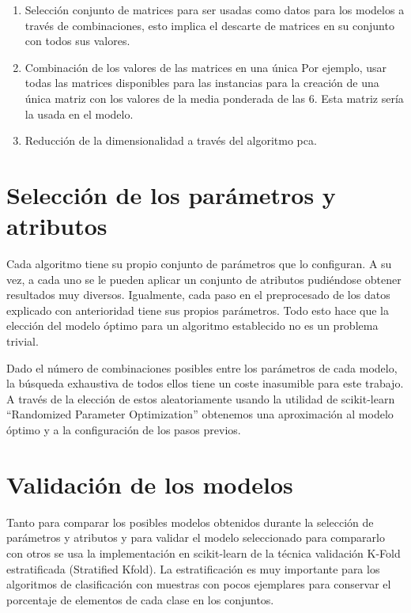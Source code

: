 \begin{enumerate}
    \item Selección conjunto de matrices para ser usadas como datos para los modelos a través de combinaciones, esto implica el descarte de matrices en su conjunto con todos sus valores.
    
    \item Combinación de los valores de las matrices en una única Por ejemplo, usar todas las matrices disponibles para las instancias para la creación de una única matriz con los valores de la media ponderada de las 6. Esta matriz sería la usada en el modelo.
    
    \item Reducción de la dimensionalidad a través del algoritmo \gls{pca}.
    
\end{enumerate}

\section{Selección de los parámetros y atributos}

Cada algoritmo tiene su propio conjunto de parámetros que lo configuran. A su vez, a cada uno se le pueden aplicar un conjunto de atributos pudiéndose obtener resultados muy diversos. Igualmente, cada paso en el preprocesado de los datos explicado con anterioridad tiene sus propios parámetros. Todo esto hace que la elección del modelo óptimo para un algoritmo establecido no es un problema trivial.

Dado el número de combinaciones posibles entre los parámetros de cada modelo, la búsqueda exhaustiva de todos ellos tiene un coste inasumible para este trabajo. A través de la elección de estos aleatoriamente usando la utilidad de scikit-learn ``Randomized Parameter Optimization'' obtenemos una aproximación al modelo óptimo y a la configuración de los pasos previos.

\section{Validación de los modelos}
Tanto para comparar los posibles modelos obtenidos durante la selección de parámetros y atributos y para validar el modelo seleccionado para compararlo con otros se usa la implementación en scikit-learn de la técnica validación K-Fold estratificada (Stratified Kfold). La estratificación es muy importante para los algoritmos de clasificación con muestras con pocos ejemplares para conservar el porcentaje de elementos de cada clase en los conjuntos.

